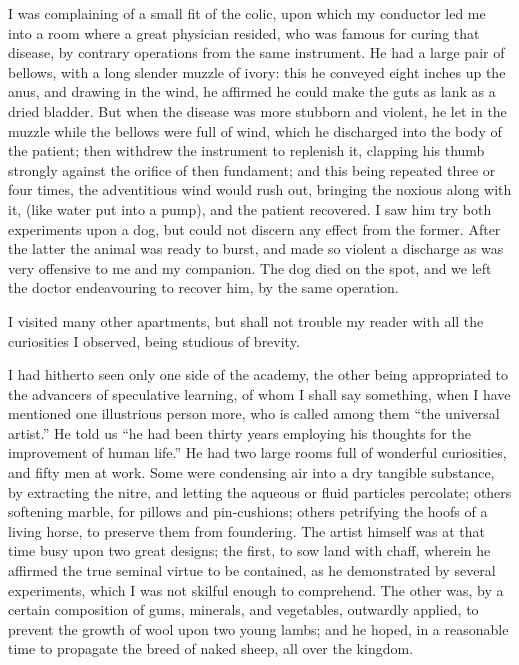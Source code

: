 I was complaining of a small fit of the colic, upon which my conductor led me into a room where a great physician resided, who was famous for curing that disease, by contrary operations from the same instrument.  He had a large pair of bellows, with a long slender muzzle of ivory: this he conveyed eight inches up the anus, and drawing in the wind, he affirmed he could make the guts as lank as a dried bladder.  But when the disease was more stubborn and violent, he let in the muzzle while the bellows were full of wind, which he discharged into the body of the patient; then withdrew the instrument to replenish it, clapping his thumb strongly against the orifice of then fundament; and this being repeated three or four times, the adventitious wind would rush out, bringing the noxious along with it, (like water put into a pump), and the patient recovered.  I saw him try both experiments upon a dog, but could not discern any effect from the former.  After the latter the animal was ready to burst, and made so violent a discharge as was very offensive to me and my companion.  The dog died on the spot, and we left the doctor endeavouring to recover him, by the same operation.

I visited many other apartments, but shall not trouble my reader with all the curiosities I observed, being studious of brevity.

I had hitherto seen only one side of the academy, the other being appropriated to the advancers of speculative learning, of whom I shall say something, when I have mentioned one illustrious person more, who is called among them “the universal artist.”  He told us “he had been thirty years employing his thoughts for the improvement of human life.”  He had two large rooms full of wonderful curiosities, and fifty men at work.  Some were condensing air into a dry tangible substance, by extracting the nitre, and letting the aqueous or fluid particles percolate; others softening marble, for pillows and pin-cushions; others petrifying the hoofs of a living horse, to preserve them from foundering.  The artist himself was at that time busy upon two great designs; the first, to sow land with chaff, wherein he affirmed the true seminal virtue to be contained, as he demonstrated by several experiments, which I was not skilful enough to comprehend.  The other was, by a certain composition of gums, minerals, and vegetables, outwardly applied, to prevent the growth of wool upon two young lambs; and he hoped, in a reasonable time to propagate the breed of naked sheep, all over the kingdom.

